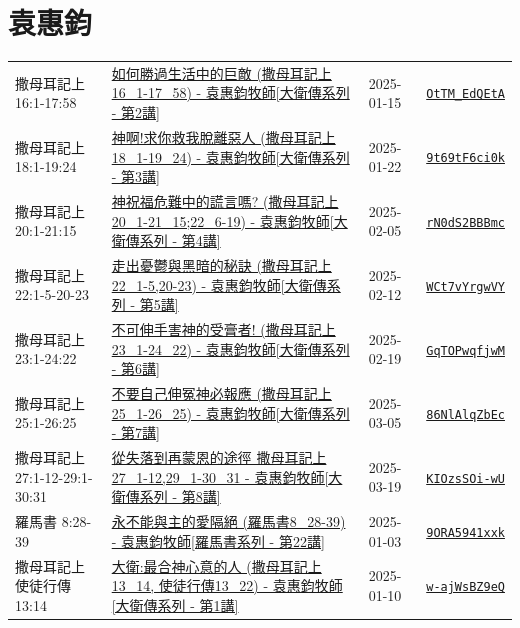 \documentclass{book}
\begin{document}
\chapter{袁惠鈞}\label{ch:preacher11}
\begin{multicols}{3}
\minitoc
\end{multicols}
{ \scriptsize


\begin{xltabular}{\textwidth}{|p{0.15\textwidth} p{0.6\textwidth}|p{0.07\textwidth} p{0.1\textwidth}|}
\hline
撒母耳記上 16:1-17:58 & \hyperref[sec:OtTM_EdQEtA]{如何勝過生活中的巨敵 (撒母耳記上16\_1-17\_58) - 袁惠鈞牧師[大衛傳系列 - 第2講]} & 2025-01-15 & \href{https://youtube.com/watch?v=OtTM_EdQEtA}{\texttt{OtTM\_EdQEtA}} \\
撒母耳記上 18:1-19:24 & \hyperref[sec:9t69tF6ci0k]{神啊!求你救我脫離惡人 (撒母耳記上18\_1-19\_24) - 袁惠鈞牧師[大衛傳系列 - 第3講]} & 2025-01-22 & \href{https://youtube.com/watch?v=9t69tF6ci0k}{\texttt{9t69tF6ci0k}} \\
撒母耳記上 20:1-21:15 & \hyperref[sec:rN0dS2BBBmc]{神祝福危難中的謊言嗎?  (撒母耳記上20\_1-21\_15;22\_6-19) - 袁惠鈞牧師[大衛傳系列 - 第4講]} & 2025-02-05 & \href{https://youtube.com/watch?v=rN0dS2BBBmc}{\texttt{rN0dS2BBBmc}} \\
撒母耳記上 22:1-5-20-23 & \hyperref[sec:WCt7vYrgwVY]{走出憂鬱與黑暗的秘訣 (撒母耳記上22\_1-5,20-23) - 袁惠鈞牧師[大衛傳系列 - 第5講]} & 2025-02-12 & \href{https://youtube.com/watch?v=WCt7vYrgwVY}{\texttt{WCt7vYrgwVY}} \\
撒母耳記上 23:1-24:22 & \hyperref[sec:GqTOPwqfjwM]{不可伸手害神的受膏者! (撒母耳記上23\_1-24\_22) - 袁惠鈞牧師[大衛傳系列 - 第6講]} & 2025-02-19 & \href{https://youtube.com/watch?v=GqTOPwqfjwM}{\texttt{GqTOPwqfjwM}} \\
撒母耳記上 25:1-26:25 & \hyperref[sec:86NlAlqZbEc]{不要自己伸冤神必報應 (撒母耳記上25\_1-26\_25) - 袁惠鈞牧師[大衛傳系列 - 第7講]} & 2025-03-05 & \href{https://youtube.com/watch?v=86NlAlqZbEc}{\texttt{86NlAlqZbEc}} \\
撒母耳記上 27:1-12-29:1-30:31 & \hyperref[sec:KIOzsSOi_wU]{從失落到再蒙恩的途徑 撒母耳記上27\_1-12,29\_1-30\_31 - 袁惠鈞牧師[大衛傳系列 - 第8講]} & 2025-03-19 & \href{https://youtube.com/watch?v=KIOzsSOi-wU}{\texttt{KIOzsSOi-wU}} \\
羅馬書 8:28-39 & \hyperref[sec:9ORA5941xxk]{永不能與主的愛隔絕 (羅馬書8\_28-39) - 袁惠鈞牧師[羅馬書系列 - 第22講]} & 2025-01-03 & \href{https://youtube.com/watch?v=9ORA5941xxk}{\texttt{9ORA5941xxk}} \\
撒母耳記上使徒行傳 13:14 & \hyperref[sec:w_ajWsBZ9eQ]{大衛:最合神心意的人 (撒母耳記上13\_14, 使徒行傳13\_22) - 袁惠鈞牧師[大衛傳系列 - 第1講]} & 2025-01-10 & \href{https://youtube.com/watch?v=w-ajWsBZ9eQ}{\texttt{w-ajWsBZ9eQ}} \\
\hline
\end{xltabular}
}
\newpage
\end{document}
